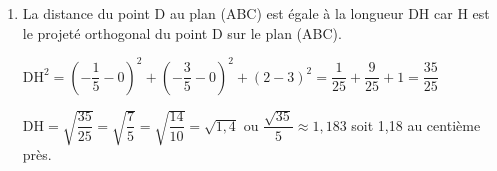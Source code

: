 \begin{enumerate}
\begin{enumerate}
Le projeté orthogonal  du point D sur le plan (ABC) est le point H de coordonnées H$\left( - \dfrac{1}{5}~;~- \dfrac{3}{5}~;~2\right)$.

	\item La distance du point D au plan (ABC) est égale à la longueur DH car H est le projeté orthogonal  du point D sur le plan (ABC).

$\mathrm{DH}^2 = {  { \left( - \dfrac{1}{5} - 0  \right) } ^2  + { \left( - \dfrac{3}{5} - 0  \right) } ^2  + (2-3)^2 }= {  \dfrac{1}{25}  +  \dfrac{9}{25}  + 1} ={ \dfrac{35}{25}}$

DH$=\sqrt{ \dfrac{35}{25}}= \sqrt{ \dfrac{7}{5}} = \sqrt{\dfrac{14}{10}} = \sqrt{1,4}$ ou $\dfrac{\sqrt{35}}{5} \approx 1,183$ soit 1,18 au centième près.
	\end{enumerate}
\end{enumerate}
